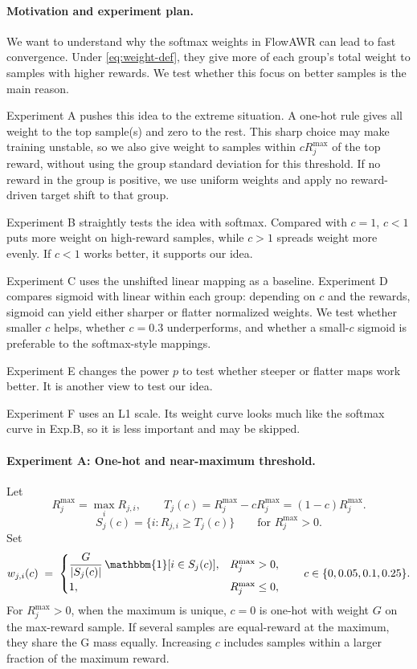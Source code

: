 \documentclass[10pt]{article} %
\begin{document}
\paragraph{Motivation and experiment plan.}
We want to understand why the softmax weights in FlowAWR can lead to fast
convergence. Under \eqref{eq:weight-def}, they give more of each group's total
weight to samples with higher rewards. We test whether this focus on better
samples is the main reason.

Experiment A pushes this idea to the extreme situation. A one-hot rule gives all weight to
the top sample(s) and zero to the rest. This sharp choice may make training
unstable, so we also give weight to samples within \(cR_j^{\max}\) of the top
reward, without using the group standard deviation for this threshold.
If no reward in the group is positive, we use uniform weights and apply no
reward-driven target shift to that group.

Experiment B straightly tests the idea with softmax. Compared with \(c=1\),
\(c<1\) puts more weight on high-reward samples, while \(c>1\) spreads weight
more evenly. If \(c<1\) works better, it supports our idea.

Experiment C uses the unshifted linear mapping as a baseline. Experiment D
compares sigmoid with linear within each group: depending on \(c\) and the
rewards, sigmoid can yield either sharper or flatter normalized weights.
We test whether smaller \(c\) helps, whether \(c=0.3\) underperforms, and
whether a small-\(c\) sigmoid is preferable to the softmax-style mappings.

Experiment E changes the power \(p\) to
test whether steeper or flatter maps work better. It is another view to test our idea.

Experiment F uses an L1
scale. Its weight curve looks much like the softmax curve in Exp.B, so it is
less important and may be skipped.



\paragraph{Experiment A: One-hot and near-maximum threshold.}

Let
\[
R_j^{\max}=\max_i R_{j,i},\qquad
T_j(c)=R_j^{\max}-cR_j^{\max}=(1-c)R_j^{\max}.
\]
\[
S_j(c)=\{i:R_{j,i}\ge T_j(c)\}\qquad\text{for }R_j^{\max}>0.
\]
Set
\[
w_{j,i}(c)
\;=\;
\begin{cases}
\displaystyle\frac{G}{|S_j(c)|}\,\mathbbm{1}[i\in S_j(c)],
& R_j^{\max}>0,\\[6pt]
1, & R_j^{\max}\le0,
\end{cases}
\qquad c\in\{0,0.05,0.1,0.25\}.
\]
For \(R_j^{\max}>0\), when the maximum is unique, \(c=0\) is one-hot with weight \(G\) on the
max-reward sample. If several samples are equal-reward at the maximum, they share the
G mass equally. Increasing \(c\) includes samples
within a larger fraction of the maximum reward. 
\end{document}
